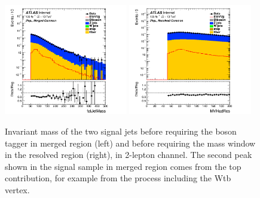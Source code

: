 \begin{figure}[H]
    \centering
     \includegraphics[width=0.48\textwidth]{figures/2lep/dataMC/C_0ptag1pfat0pjet_0ptv_MergedCommon_fatJetMass_Log} 
     \includegraphics[width=0.48\textwidth]{figures/2lep/dataMC/C_0ptag2pjet_0ptv_ResolvedCommon_MVHadRes_Log}
    \caption{Invariant mass of the two signal jets before requiring the boson tagger in merged region (left) and before requiring the mass window in the resolved region (right), in 2-lepton channel. 
    The second peak shown in the signal sample in merged region comes from the top contribution, for example from the process including the Wtb vertex.
    }
    \label{fig:MVHadResSR}
\end{figure}

